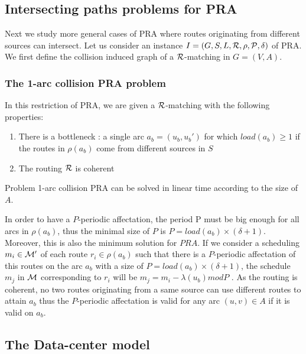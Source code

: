 \documentclass{article}
\newcommand\rmatching{$\cal R$-matching\xspace}
\begin{document}
\subsection{Intersecting paths problems for PRA}

Next we study more general cases of PRA where routes originating from different sources can intersect. Let us consider an instance $I= (G, S, L, \cal R, \rho, P, \delta)$ of PRA. We first define the collision induced graph of a \rmatching in $G=(V,A)$.


\subsubsection{The 1-arc collision PRA problem}

In this restriction of PRA, we are given a \rmatching with the following properties:
\begin{enumerate}
\item There is a bottleneck : a single arc $a_b=(u_b, u_b')$ for which $load(a_b) \geq 1$ if the routes in $\rho(a_b)$ come from different sources in $S$
\item The routing $\cal R$ is coherent 
\end{enumerate}

\begin{proposition}
\label{1-arc PRA}
Problem 1-arc collision PRA can be solved in linear time according to the size of $A$.

\end{proposition}

In order to have a $P$-periodic affectation, the period P must be big enough for all arcs in $\rho(a_b)$, thus the minimal size of $P$ is $P= load(a_b) \times (\delta + 1)$. Moreover, this is also the minimum solution for $PRA$. If we consider a scheduling $m_i \in \cal M'$ of each route $r_i \in \rho(a_b)$ such that there is a $P$-periodic affectation of this routes on the arc $a_b$ with a size of $P =  load(a_b) \times (\delta + 1)$, the schedule $m_j$ in $\cal M$ corresponding to $r_i$ will be $m_j = m_i - \lambda(u_b) mod P$ . As the routing is coherent, no two routes originating from a same source can use different routes to attain $a_b$ thus the $P$-periodic affectation is valid for any arc $(u,v) \in A$ if it is valid on $a_b$.


\subsection{The Data-center model}
\end{document}
